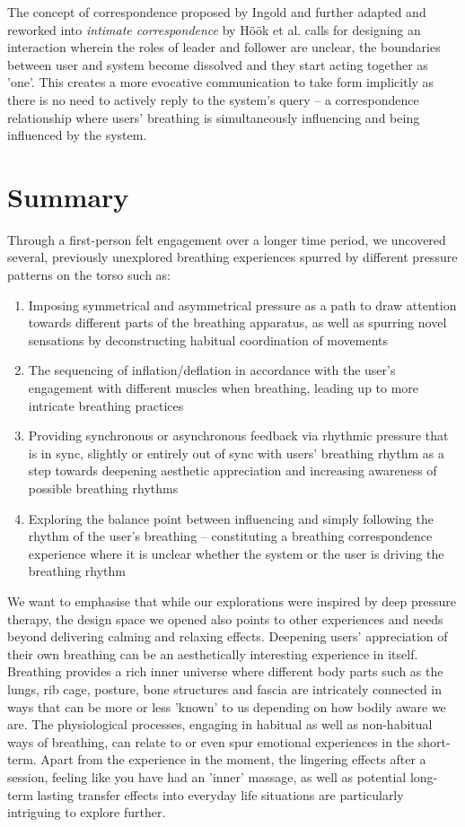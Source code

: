 The concept of correspondence proposed by Ingold \cite{ingold_being_2011} and further adapted and reworked into \textit{intimate correspondence} by Höök et al. \cite{hook_somaesthetic_2016} calls for designing an interaction wherein the roles of leader and follower are unclear, the boundaries between user and system become dissolved and they start acting together as 'one'. This creates a more evocative communication to take form implicitly as there is no need to actively reply to the system's query -- a correspondence relationship where users' breathing is simultaneously influencing and being influenced by the system.


\section{Summary}
Through a first-person felt engagement over a longer time period, we uncovered several, previously unexplored breathing experiences spurred by different pressure patterns on the torso such as:

\begin{enumerate}
    \item Imposing symmetrical and asymmetrical pressure as a path to draw attention towards different  parts of the breathing apparatus, as well as spurring novel sensations by deconstructing habitual coordination of movements
    \item The sequencing of inflation/deflation in accordance with the user's engagement with different muscles when breathing, leading up to more intricate breathing practices
    \item Providing synchronous or asynchronous feedback via rhythmic pressure that is in sync, slightly or entirely out of sync with users' breathing rhythm as a step towards deepening aesthetic appreciation and increasing awareness of possible breathing rhythms
    \item Exploring the balance point between influencing and simply following the rhythm of the user’s breathing -- constituting a breathing correspondence experience where it is unclear whether the system or the user is driving the breathing rhythm
\end{enumerate}

We want to emphasise that while our explorations were inspired by deep pressure therapy, the design space we opened also points to other experiences and needs beyond delivering calming and relaxing effects. Deepening users' appreciation of their own breathing can be an aesthetically interesting experience in itself. Breathing provides a rich inner universe where different body parts such as the lungs, rib cage, posture, bone structures and fascia are intricately connected in ways that can be more or less 'known' to us depending on how bodily aware we are. The physiological processes, engaging in habitual as well as non-habitual ways of breathing, can relate to or even spur emotional experiences in the short-term.
Apart from the experience in the moment, the lingering effects after a session, feeling like you have had an 'inner' massage, as well as potential long-term lasting transfer effects into everyday life situations are particularly intriguing to explore further.


